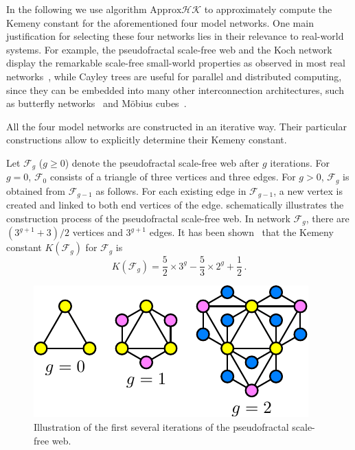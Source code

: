 \documentclass[10pt,journal,compsoc,twocolumn,twoside]{IEEEtran}
\begin{document}
In the following we use algorithm \(\text{Approx}\mathcal{HK}\) to approximately compute the Kemeny constant for the aforementioned four model networks. One main justification for selecting  these four networks lies in their relevance to real-world systems. For example,  the pseudofractal scale-free web and the Koch network display the remarkable scale-free small-world properties as observed in most real networks~\cite{Ne03}, while  Cayley trees are useful for parallel and distributed computing, since they can be embedded into many other interconnection architectures, such as butterfly networks~\cite{GuHa91} and M{\"o}bius cubes~\cite{LiFaJi16}.

All the four model networks are constructed in an iterative way. Their particular constructions allow to explicitly determine their Kemeny constant.


Let \(\mathcal{F}_g\) (\(g \geq 0\)) denote the pseudofractal scale-free web after \(g\) iterations. For \(g=0\), \( \mathcal{F}_0\) consists of a triangle of three vertices and three edges. For \(g>0\), \(\mathcal{F}_g\) is obtained from \(\mathcal{F}_{g-1}\) as follows. For each existing edge in \(\mathcal{F}_{g-1}\), a new vertex is created and linked to both end vertices of the edge.   schematically illustrates the construction process of the pseudofractal scale-free web. In network \(\mathcal{F}_g\), there are \((3^{g+1}+3)/2\) vertices and \(3^{g+1}\) edges.  It has been shown~\cite{XiZhCo16} that the Kemeny constant \(K(\mathcal{F}_g) \) for \(\mathcal{F}_g\) is
\begin{equation}\label{Kg01}
    K(\mathcal{F}_g)=\frac{5}{2}\times3^g-\frac{5}{3}\times2^g+\frac{1}{2}\,. %
\end{equation}

\begin{figure}[!t]
    \centering
    \includegraphics[width=0.75\linewidth]{Pseudofractal-eps-converted-to.pdf}
    \caption{ Illustration of the first several iterations of the pseudofractal scale-free web. }
    \label{psfw1}
\end{figure}
\end{document}
